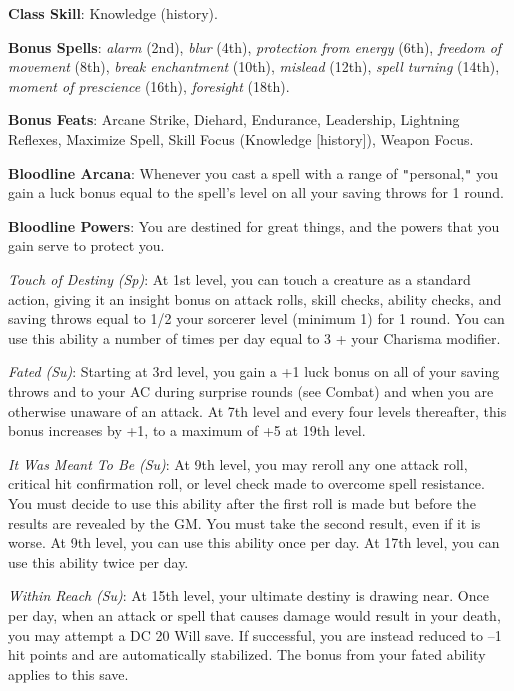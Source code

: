 \textbf{Class Skill}: Knowledge (history).
				
\textbf{Bonus Spells}:\textit{ alarm} (2nd), \textit{blur} (4th), \textit{protection from energy} (6th), 
\textit{freedom of movement} (8th), \textit{break enchantment }(10th), \textit{mislead} (12th), \textit{spell turning} (14th), 
\textit{moment of prescience }(16th), \textit{foresight} (18th).
				
\textbf{Bonus Feats}: Arcane Strike, Diehard, Endurance, Leadership, Lightning Reflexes, Maximize Spell, 
Skill Focus (Knowledge \mbox{$[$}history\mbox{$]$}), Weapon Focus.
				
\textbf{Bloodline Arcana}: Whenever you cast a spell with a range of \texttt{{}"{}}personal,\texttt{{}"{}} you gain a luck bonus 
equal to the spell's level on all your saving throws for 1 round.
				
\textbf{Bloodline Powers}: You are destined for great things, and the powers that you gain serve to protect you.
				
\textit{Touch of Destiny} \textit{(Sp)}: At 1st level, you can touch a creature as a standard action, giving it an insight bonus on
attack rolls, skill checks, ability checks, and saving throws equal to 1/2 your sorcerer level (minimum 1) for 1 round. You can use
this ability a number of times per day equal to 3 + your Charisma modifier.
				
\textit{Fated} \textit{(Su)}: Starting at 3rd level, you gain a +1 luck bonus on all of your saving throws and to your AC during
surprise rounds (see Combat) and when you are otherwise unaware of an attack. At 7th level and every four levels thereafter, this
bonus increases by +1, to a maximum of +5 at 19th level.
				
\textit{It Was Meant To Be} \textit{(Su)}: At 9th level, you may reroll any one attack roll, critical hit confirmation roll, or
level check made to overcome spell resistance. You must decide to use this ability after the first roll is made but before the 
results are revealed by the GM. You must take the second result, even if it is worse. At 9th level, you can use this ability 
once per day. At 17th level, you can use this ability twice per day.
				
\textit{Within Reach} \textit{(Su)}: At 15th level, your ultimate destiny is drawing near. Once per day, when an attack or spell
that causes damage would result in your death, you may attempt a DC 20 Will save. If successful, you are instead reduced to --1
hit points and are automatically stabilized. The bonus from your fated ability applies to this save.
				
